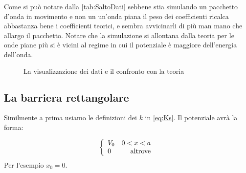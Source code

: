 Come si pu\`o notare dalla \autoref{tab:SaltoDati} sebbene stia simulando un pacchetto d'onda in movimento e non un un'onda piana il peso dei coefficienti ricalca abbastanza bene i coefficienti teorici, e sembra avvicinarli di pi\`u man mano che allargo il pacchetto. Notare che la simulazione si allontana dalla teoria per le onde piane pi\`u si \`e vicini al regime in cui il potenziale \`e maggiore dell'energia dell'onda.

\begin{figure}[hbt]
  \centering
  \caption{La visualizzazione dei dati e il confronto con la teoria}
\end{figure}

\subsection{La barriera rettangolare}
Similmente a prima usiamo le definizioni dei $k$ in \eqref{eq:Ks}. Il potenziale avr\`a la forma:

\begin{equation}
  \lr\{.{\begin{array}{lr}
      V_0& 0<x<a\\
      0&\text{altrove}
  \end{array}}
\end{equation}
Per l'esempio $x_0=0$.

